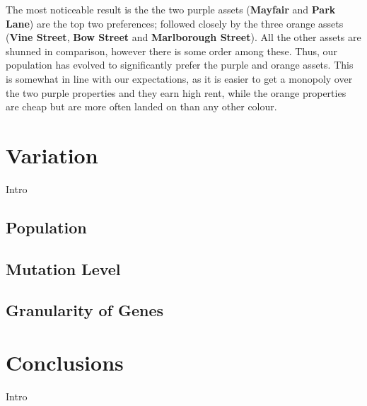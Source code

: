 \documentclass[11pt,a4paper,twocolumn]{scrartcl}
\begin{document}
The most noticeable result is the the two purple assets (\textbf{Mayfair} and \textbf{Park Lane}) are the top two preferences; followed closely by the three orange assets (\textbf{Vine Street}, \textbf{Bow Street} and \textbf{Marlborough Street}). All the other assets are shunned in comparison, however there is some order among these. Thus, our population has evolved to significantly prefer the purple and orange assets. This is somewhat in line with our expectations, as it is easier to get a monopoly over the two purple properties and they earn high rent, while the orange properties are cheap but are more often landed on than any other colour.

\section{Variation}
\label{sec:var}

Intro

\subsection{Population}

\subsection{Mutation Level}

\subsection{Granularity of Genes}



\section{Conclusions} 
\label{sec:con}

Intro
\end{document}
